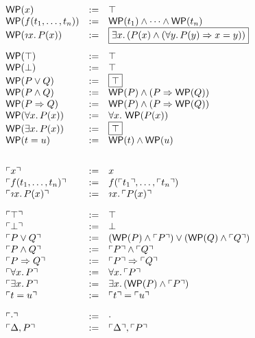 \documentclass[10pt,letter]{article}
\begin{document}
\[
\begin{array}{lll}
  \wp{\x} & := & \pTrue\\
  \wp{\tFun{\f}{\t}{n}} & := & \pAnd{\wp{\t_1}}{\pAnd{\cdots}{\wp{\t_n}}}\\
  \wp{\tDesc{\x}{\I}{\p(\x)}} & := &
\mbox{\fbox{$
        \pExists{\x}{\I}{(\pAnd{\p(\x)}{(\pForall{\y}{\I}
               {\pImply{\p(\y)}{\x=\y}})})}$}}\\[10pt]

  \wp{\pTrue} & := & \pTrue\\
  \wp{\pFalse} & := & \pTrue\\
  \wp{\pOr{\p}{\q}} & := & \mbox{\fbox{$\pTrue$}}\\
  \wp{\pAnd{\p}{\q}} & := & \pAnd{\wp{\p}}{(\pImply{\p}{\wp{\q}})}\\
  \wp{\pImply{\p}{\q}} & := & \pAnd{\wp{\p}}{(\pImply{\p}{\wp{\q}})}\\
  \wp{\pForall{\x}{\I}{\p(\x)}} & := & \pForall{\x}{\I}{\wp{\p(\x)}}\\
  \wp{\pExists{\x}{\I}{\p(\x)}} & := & \mbox{\fbox{$\pTrue$}}\\
  \wp{\pEqual{\t}{\u}} & := & \pAnd{\wp{\t}}{\wp{\u}}\\[20pt]
  
  \trans{\x} & := & \x\\
  \trans{\tFun{\f}{\t}{n}} & := & \f(\trans{\t_1},\ldots,\trans{\t_n})\\
  \trans{\tDesc{\x}{\I}{\p(\x)}} & := & \tDesc{\x}{\I}{\trans{\p(\x)}}\\[10pt]
  
  \trans{\pTrue} & := & \pTrue\\
  \trans{\pFalse} & := & \pFalse\\
  \trans{\pOr{\p}{\q}} & := & \pOr{(\pAnd{\wp{\p}}{\trans{\p}})}{(\pAnd{\wp{\q}}{\trans{\q}})}\\
  \trans{\pAnd{\p}{\q}} & := & \pAnd{\trans{\p}}{\trans{\q}}\\
  \trans{\pImply{\p}{\q}} & := & \pImply{\trans{\p}}{\trans{\q}}\\
  \trans{\pForall{\x}{\I}{\p}} & := & \pForall{\x}{\I}{\trans{\p}} \\
  \trans{\pExists{\x}{\I}{\p}} & := & \pExists{\x}{\I}{(\pAnd{\wp{\p}}{\trans{\p}})}\\
  \trans{\pEqual{\t}{\u}} & := & \pEqual{\trans{\t}}{\trans{\u}}\\[10pt]
  
  \trans{\emptyCtx} & := & \emptyCtx\\
  \trans{\D,\p} & := & \trans{\D},\trans{\p}\\
\end{array}
\]
\end{document}
